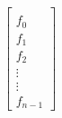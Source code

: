 \documentclass[preview]{standalone}
\begin{document}
\begin{align*}
\left[\begin{array}{l}\\f_{0} \\f_{1} \\f_{2} \\\vdots \\\vdots \\f_{n-1}\end{array}\right]
\end{align*}
\end{document}

